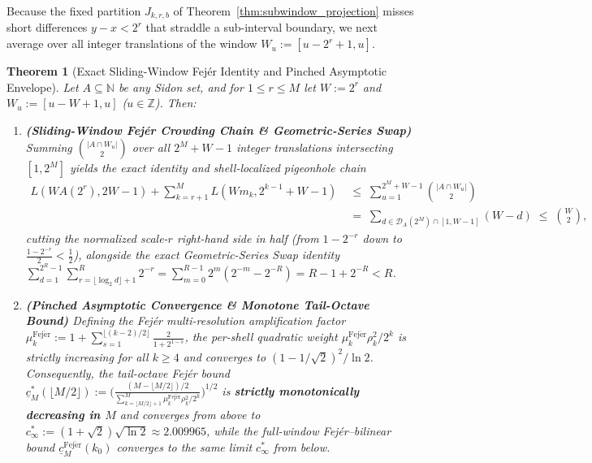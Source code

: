 \documentclass[11pt,reqno]{amsart}
\newtheorem{theorem}{Theorem}[section]
\theoremstyle{definition}
\theoremstyle{remark}
\begin{document}
Because the fixed partition $J_{k,r,b}$ of Theorem~\ref{thm:subwindow_projection} misses short differences $y - x < 2^r$ that straddle a sub-interval boundary, we next average over all integer translations of the window $W_u := [u - 2^r + 1, u]$.

\begin{theorem}[Exact Sliding-Window Fej\'er Identity and Pinched Asymptotic Envelope]\label{thm:sliding_fejer}
Let $A \subseteq \mathbb{N}$ be any Sidon set, and for $1 \le r \le M$ let $W := 2^r$ and $W_u := [u - W + 1, u]$ ($u \in \mathbb{Z}$). Then:
\begin{enumerate}
  \item[\textup{(a)}] \textbf{(Sliding-Window Fej\'er Crowding Chain \& Geometric-Series Swap)} Summing $\binom{|A \cap W_u|}{2}$ over all $2^M + W - 1$ integer translations intersecting $[1, 2^M]$ yields the exact identity and shell-localized pigeonhole chain
  \begin{equation}\label{eq:sliding_fejer_chain}
    \begin{aligned}
      L(W A(2^r), 2 W - 1) + \sum_{k=r+1}^M L(W m_k, 2^{k-1} + W - 1) &\;\le\; \sum_{u=1}^{2^M + W - 1} \binom{|A \cap W_u|}{2} \\
      &\;=\; \sum_{d \in \mathcal{D}_A(2^M) \cap [1, W - 1]} (W - d) \;\le\; \binom{W}{2},
    \end{aligned}
  \end{equation}
  cutting the normalized scale-$r$ right-hand side in half (from $1 - 2^{-r}$ down to $\frac{1 - 2^{-r}}{2} < \frac{1}{2}$), alongside the exact Geometric-Series Swap identity $\sum_{d=1}^{2^R - 1} \sum_{r=\lfloor \log_2 d \rfloor + 1}^R 2^{-r} = \sum_{m=0}^{R-1} 2^m(2^{-m} - 2^{-R}) = R - 1 + 2^{-R} < R$.
  \item[\textup{(b)}] \textbf{(Pinched Asymptotic Convergence \& Monotone Tail-Octave Bound)} Defining the Fej\'er multi-resolution amplification factor $\mu_k^{\mathrm{Fej\acute{e}r}} := 1 + \sum_{s=1}^{\lfloor (k-2)/2 \rfloor} \frac{2}{1 + 2^{1-s}}$, the per-shell quadratic weight $\mu_k^{\mathrm{Fej\acute{e}r}} \rho_k^2 / 2^k$ is strictly increasing for all $k \ge 4$ and converges to $(1 - 1/\sqrt{2})^2 / \ln 2$. Consequently, the tail-octave Fej\'er bound $\underline{c}_M^*(\lfloor M/2\rfloor) := \bigl(\frac{(M - \lfloor M/2\rfloor)/2}{\sum_{k=\lfloor M/2\rfloor+1}^M \mu_k^{\mathrm{Fej\acute{e}r}} \rho_k^2 / 2^k}\bigr)^{1/2}$ is \textbf{strictly monotonically decreasing in $M$} and converges from above to $c_\infty^* := (1 + \sqrt{2})\sqrt{\ln 2} \approx 2.009965$, while the full-window Fej\'er--bilinear bound $\underline{c}_M^{\mathrm{Fej\acute{e}r}}(k_0)$ converges to the same limit $c_\infty^*$ from below.
\end{enumerate}
\end{theorem}
\end{document}
